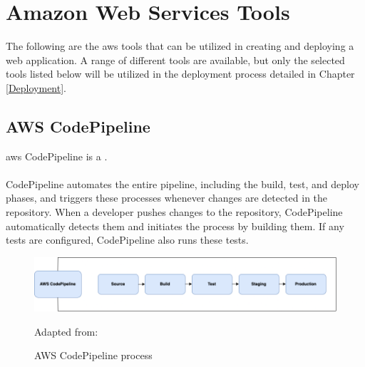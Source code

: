 \section{Amazon Web Services Tools}

The following are the \acrshort{aws} tools that can be utilized in creating and deploying a web application. A range of different tools are available, but only the selected tools listed below will be utilized in the deployment process detailed in Chapter \ref{Deployment}.

\subsection{AWS CodePipeline}
\acrshort{aws} CodePipeline is a  \cite{AWSCodePipeline}.
\\~\\
CodePipeline automates the entire \gls{pipeline}, including the build, test, and deploy phases, and triggers these processes whenever changes are detected in the repository. When a developer pushes changes to the repository, CodePipeline automatically detects them and initiates the process by building them. If any tests are configured, CodePipeline also runs these tests.\cite{AWSCodePipeline1}
\begin{figure}[H]
    \centering
    \includegraphics[scale=0.4]{Images/CodePipeline.png}
    \caption{AWS CodePipeline process}Adapted from: \cite{AWSCodePipeline2}
    \label{fig: AWS CodePipeline Process}
\end{figure}

